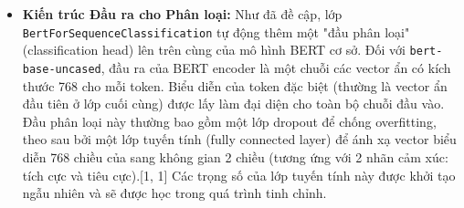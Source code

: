 \begin{itemize}
    \item \textbf{Kiến trúc Đầu ra cho Phân loại:}
    Như đã đề cập, lớp \texttt{BertForSequenceClassification} tự động thêm một "đầu phân loại" (classification head) lên trên cùng của mô hình BERT cơ sở. Đối với \texttt{bert-base-uncased}, đầu ra của BERT encoder là một chuỗi các vector ẩn có kích thước 768 cho mỗi token. Biểu diễn của token \texttt{} đặc biệt (thường là vector ẩn đầu tiên ở lớp cuối cùng) được lấy làm đại diện cho toàn bộ chuỗi đầu vào. Đầu phân loại này thường bao gồm một lớp dropout để chống overfitting, theo sau bởi một lớp tuyến tính (fully connected layer) để ánh xạ vector biểu diễn 768 chiều của \texttt{} sang không gian 2 chiều (tương ứng với 2 nhãn cảm xúc: tích cực và tiêu cực).[1, 1] Các trọng số của lớp tuyến tính này được khởi tạo ngẫu nhiên và sẽ được học trong quá trình tinh chỉnh.


\end{itemize}
